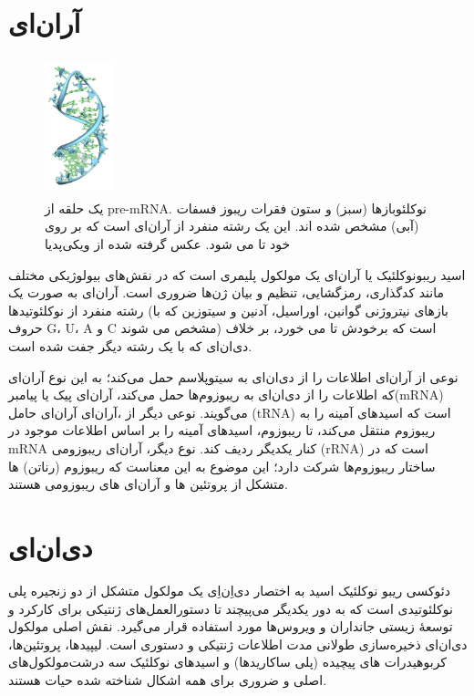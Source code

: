 \documentclass[12pt,a4paper,BCOR=.7cm,headsepline,bibliography=totoc]{report}
\begin{document}
\section{آر‌ان‌ای}
\begin{figure}
\centering
\includegraphics[width=2cm, height=4cm]{pictures/Pre-mRNA-1ysv-tubes.png}
\caption{
یک حلقه از pre-mRNA. نوکلئوبازها (سبز) و ستون فقرات ریبوز فسفات (آبی) مشخص شده اند. این یک رشته منفرد از آر‌ان‌ای است که بر روی خود تا می شود. عکس گرفته شده از ویکی‌پدیا
}\label{wrap-fig:1}
\end{figure}
اسید ریبونوکلئیک یا آر‌ان‌ای
 یک مولکول پلیمری است که در نقش‌های بیولوژیکی مختلف مانند کدگذاری، رمزگشایی، تنظیم و بیان ژن‌ها ضروری است. آر‌ان‌ای به صورت یک رشته منفرد از نوکلئوتیدها (بازهای نیتروژنی گوانین، اوراسیل، آدنین و سیتوزین که با حروف G، U، A و C مشخص می شوند) است که برخودش تا می خورد، بر خلاف دی‌ان‌ای که با یک رشته دیگر جفت شده است.
 
نوعی از آر‌ان‌ای اطلاعات را از دی‌ان‌ای به سیتوپلاسم حمل می‌کند؛ به این نوع آر‌ان‌ای که اطلاعات را از دی‌ان‌ای به ریبوزوم‌ها حمل می‌کند، آر‌ان‌ای پیک یا پیامبر(mRNA) می‌گویند. نوعی دیگر از ،آر‌ان‌ای
آر‌ان‌ای
 حامل (tRNA) است که اسیدهای آمینه را به ریبوزوم منتقل می‌کند، تا ریبوزوم، اسیدهای آمینه را بر اساس اطلاعات موجود در mRNA کنار یکدیگر ردیف کند. نوع دیگر، آر‌ان‌ای ریبوزومی (rRNA) است که در ساختار ریبوزوم‌ها شرکت دارد؛ این موضوع به این معناست که ریبوزوم (رناتن) ها متشکل از پروتئین ها و آر‌ان‌ای های ریبوزومی هستند.
\section{دی‌ان‌ای}

دئوکسی ریبو نوکلئیک اسید به اختصار دی‌اِن‌اِی یک مولکول متشکل از دو زنجیره پلی نوکلئوتیدی است که به دور یکدیگر می‌پیچند تا دستورالعمل‌های ژنتیکی برای کارکرد و توسعهٔ زیستی جانداران و ویروس‌ها مورد استفاده قرار می‌گیرد. نقش اصلی مولکول دی‌ان‌ای ذخیره‌سازی طولانی مدت اطلاعات ژنتیکی و دستوری است. لیپید‌ها، پروتئین‌ها، کربوهیدرات های پیچیده (پلی ساکاریدها) و اسیدهای نوکلئیک سه درشت‌مولکول‌های اصلی و ضروری برای همه اشکال شناخته شده حیات هستند.
\end{document}
